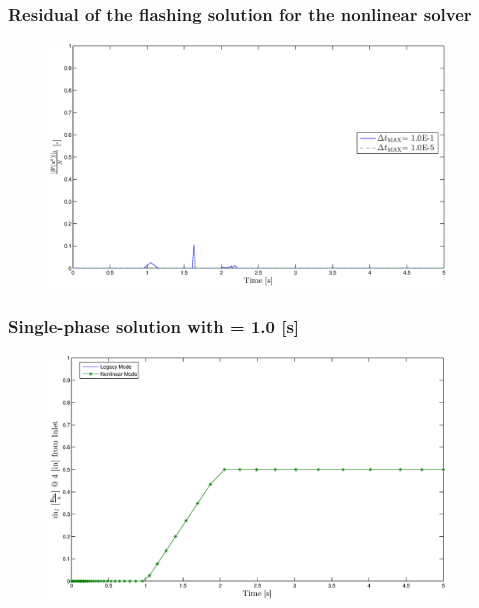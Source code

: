 \documentclass[compress,xcolor=table]{beamer}
\begin{document}
\begin{frame}
\frametitle{Residual of the flashing solution for the nonlinear solver}

\begin{figure}[h!t]
\centering
\includegraphics[width=0.94\textwidth]{images/nl_flashing_res_compare.eps}
\end{figure}

\end{frame}
\begin{frame}
\frametitle{Single-phase solution with \dtmax{} = 1.0 {[s]}}

\begin{figure}[h!t]
\centering
\includegraphics[width=0.94\textwidth]{images/single_1em0.eps}
\end{figure}

\end{frame}
\end{document}
